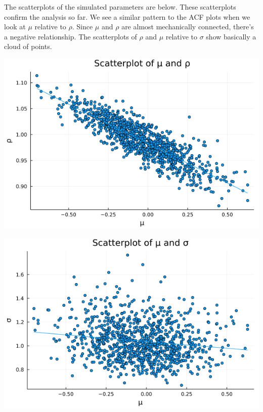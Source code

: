 \documentclass{article}
\begin{document}
\begin{enumerate}
\begin{center}
\end{center}


The scatterplots of the simulated parameters are below.  These scatterplots confirm the analysis so far.  We see a similar pattern to the ACF plots when we look at $\mu$ relative to $\rho$. Since $\mu$ and $\rho$ are almost mechanically connected, there's a negative relationship. The scatterplots of $\rho$ and $\mu$ relative to $\sigma$ show basically a cloud of points.

\begin{center}

\includegraphics[scale=0.5]{p2_q3_mu_rho.png}

\includegraphics[scale=0.5]{p2_q3_mu_sigma.png}


\end{center}
\end{enumerate}
\end{document}
